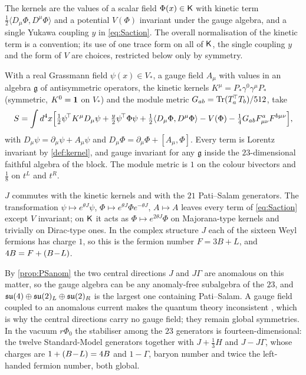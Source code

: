 \begin{assumption}
\label{ass:field}
The kernels are the values of a scalar field $\Phi(x)\in\mathsf K$ with kinetic term $\tfrac12\langle D_\mu\Phi,D^\mu\Phi\rangle$ and a potential $V(\Phi)$
invariant under the gauge algebra, and a single Yukawa coupling $y$ in \eqref{eq:Saction}. The overall normalisation of the kinetic term is a
convention; its use of one trace form on all of $\mathsf K$, the single coupling $y$ and the form of $V$ are choices, restricted below only by symmetry.
\end{assumption}

With a real Grassmann field $\psi(x)\in V_*$, a gauge field $A_\mu$ with values in an algebra $\mathfrak g$ of antisymmetric operators, the kinetic
kernels $K^\mu=P_*\gamma^0\gamma^\mu P_*$ (symmetric, $K^0=\mathbf 1$ on $V_*$) and the module metric $G_{ab}=\operatorname{Tr}(T_a^{\!\top}T_b)/512$, take
\begin{equation}
\label{eq:Saction}
S=\int d^4x\Bigl[\tfrac12\psi^{\!\top}K^\mu D_\mu\psi+\tfrac y2\psi^{\!\top}\Phi\psi+\tfrac12\langle D_\mu\Phi,D^\mu\Phi\rangle-V(\Phi)-\tfrac14G_{ab}F^a_{\mu\nu}F^{b\mu\nu}\Bigr],
\end{equation}
with $D_\mu\psi=\partial_\mu\psi+A_\mu\psi$ and $D_\mu\Phi=\partial_\mu\Phi+[A_\mu,\Phi]$. Every term is Lorentz invariant by \cref{def:kernel}, and gauge
invariant for any $\mathfrak g$ inside the $23$-dimensional faithful algebra of the block. The module metric is $1$ on the colour bivectors and
$\tfrac18$ on $t^L$ and $t^R$.

\begin{proposition}
\label{prop:fermionnumber}
$J$ commutes with the kinetic kernels and with the $21$ Pati--Salam generators. The transformation $\psi\mapsto e^{\theta J}\psi$,
$\Phi\mapsto e^{\theta J}\Phi e^{-\theta J}$, $A\mapsto A$ leaves every term of \eqref{eq:Saction} except $V$ invariant; on $\mathsf K$ it acts as
$\Phi\mapsto e^{2\theta J}\Phi$ on Majorana-type kernels and trivially on Dirac-type ones. In the complex structure $J$ each of the sixteen Weyl
fermions has charge $1$, so this is the fermion number $F=3B+L$, and $4B=F+(B\!-\!L)$.
\end{proposition}

By \cref{prop:PSanom} the two central directions $J$ and $J\Gamma$ are anomalous on this matter, so the gauge algebra can be any anomaly-free
subalgebra of the $23$, and $\mathfrak{su}(4)\oplus\mathfrak{su}(2)_L\oplus\mathfrak{su}(2)_R$ is the largest one containing Pati--Salam. A gauge field coupled to an anomalous current
makes the quantum theory inconsistent \cite{GrossJackiw72,BouchiatIliopoulosMeyer72}, which is why the central directions carry no gauge
field; they remain global symmetries. In the vacuum $r\Phi_0$ the stabiliser among the $23$ generators is fourteen-dimensional: the twelve
Standard-Model generators together with $J+\tfrac13H$ and $J-J\Gamma$, whose charges are $1+(B\!-\!L)=4B$ and $1-\Gamma$, baryon number and twice
the left-handed fermion number, both global.

